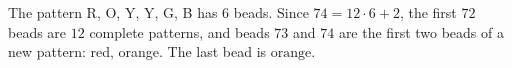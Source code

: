 The pattern R, O, Y, Y, G, B has $6$ beads. Since $74=12\cdot6+2$, the first $72$ beads are $12$ complete patterns, and beads $73$ and $74$ are the first two beads of a new pattern: red, orange. The last bead is $\boxed{\text{orange}}$.
